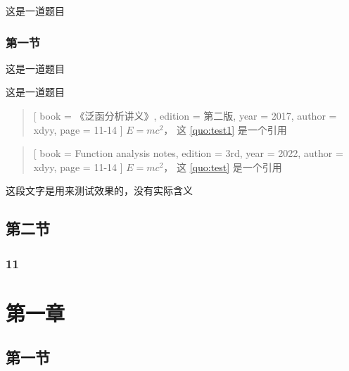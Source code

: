\documentclass{xdyy-notes}
\begin{document}
\begin{exercise}
  这是一道题目
\end{exercise}

\subsection{第一节}

\begin{exercise}
  这是一道题目
\end{exercise}

\begin{exercise}
  这是一道题目
\end{exercise}


\begin{quotation}[
  book    = {《泛函分析讲义》},      %
  edition = {第二版},                %
  year    = {2017},                  %
  author  = {xdyy},                  %
  page    = {11-14}                  %
]\label{quo:test1}
  $E = m c^2$， 这 \ref{quo:test1} 是一个引用
\end{quotation}


\begin{quotation}[
  book = {Function analysis notes},
  edition = {3rd},
  year = {2022},
  author = {xdyy},
  page = {11-14}
]\label{quo:test}
  $E = m c^2$， 这 \ref{quo:test} 是一个引用
\end{quotation}


\begin{detail}[
  book = {《泛函分析讲义》},
  author = {许全华},
  edition = {第一版},
  year = {2017},
  page = {103},
  line = {倒数第三行},
  original = {
    \zhlipsum[1-2]
  }
]
  这段文字是用来测试效果的，没有实际含义
\end{detail}





\correction[
  book = {《摸鱼讲义》},
  author = {夏康玮},
  edition = {第一版},
  year = {2022},
  page = {88},
  line = {3},
  original = {
    \zhlipsum[1]
  },
  revision = {
    \zhlipsum[2]
  },
  explanation = {
    无须多言
  }
]

\section{第二节}


\zhlipsum[1-6]






\subsection{11}


\zhlipsum[1-2]



\chapter{第一章}

\section{第一节}
\cite{DiophantineQueffelec}


\backmatter
\printbibliography
\end{document}
